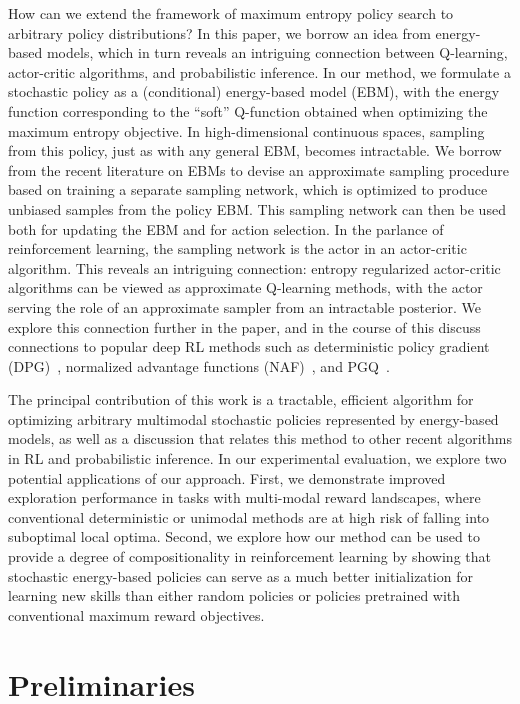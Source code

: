 \documentclass{article}
\begin{document}
%
%
%
How can we extend the framework of maximum entropy policy search to arbitrary policy distributions? 
In this paper, we borrow an idea from energy-based models, which in turn reveals an intriguing connection between Q-learning, actor-critic algorithms, and probabilistic inference. In our method, we formulate a stochastic policy as a (conditional) energy-based model (EBM), with the energy function corresponding to the ``soft'' Q-function obtained when optimizing the maximum entropy objective. In high-dimensional continuous spaces, sampling from this policy, just as with any general EBM, becomes intractable. We borrow from the recent literature on EBMs to devise an approximate sampling procedure based on training a separate sampling network, which is optimized to produce unbiased samples from the policy EBM. This sampling network can then be used both for updating the EBM and for action selection. In the parlance of reinforcement learning, the sampling network is the actor in an actor-critic algorithm.
This reveals an intriguing connection: entropy regularized actor-critic algorithms can be viewed as approximate Q-learning methods, with the actor serving the role of an approximate sampler from an intractable posterior. We explore this connection further in the paper, and in the course of this discuss connections to popular deep RL methods such as deterministic policy gradient (DPG)~\cite{silver2014deterministic, lillicrap2015continuous}, 
normalized advantage functions (NAF)~\cite{gu2016continuous}, and PGQ~\cite{o2016pgq}.

%
The principal contribution of this work is a tractable, efficient algorithm for optimizing arbitrary multimodal stochastic policies represented by energy-based models, as well as a discussion that relates this method to other recent algorithms in RL and probabilistic inference. In our experimental evaluation, we explore two potential applications of our approach. First, we demonstrate improved exploration performance in tasks with multi-modal reward landscapes, where conventional deterministic or unimodal methods are at high risk of falling into suboptimal local optima. Second, we explore how our method can be used to provide a degree of compositionality in reinforcement learning by showing that stochastic energy-based policies can serve as a much better initialization for learning new skills than either random policies or policies pretrained with conventional maximum reward objectives.

\vspace{-2mm}
\section{Preliminaries}
\label{sec:preliminaries}
\vspace{-1mm}
\end{document}
